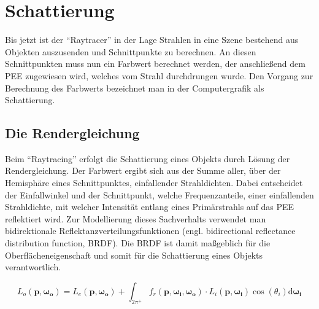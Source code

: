 

\chapter{Schattierung} \label{ch:schattierung}


Bis jetzt ist der "`Raytracer"' in der Lage Strahlen in eine Szene bestehend aus Objekten auszusenden und Schnittpunkte zu berechnen. An diesen Schnittpunkten muss nun ein Farbwert berechnet werden, der anschließend dem PEE zugewiesen wird, welches vom Strahl durchdrungen wurde. Den Vorgang zur Berechnung des Farbwerts bezeichnet man in der Computergrafik als Schattierung. 


\section{Die Rendergleichung}

Beim "`Raytracing"' erfolgt die Schattierung eines Objekts durch Lösung der Rendergleichung. Der Farbwert ergibt sich aus der Summe aller, über der Hemisphäre eines Schnittpunktes, einfallender Strahldichten. Dabei entscheidet der Einfallwinkel und der Schnittpunkt, welche Frequenzanteile, einer einfallenden Strahldichte, mit welcher Intensität entlang eines Primärstrahls auf das PEE reflektiert wird. Zur Modellierung dieses Sachverhalts verwendet man bidirektionale Reflektanzverteilungsfunktionen (engl. bidirectional reflectance distribution function, BRDF). Die BRDF ist damit maßgeblich für die Oberflächeneigenschaft und somit für die Schattierung eines Objekts verantwortlich.

\begin{equation}
    L_o(\boldsymbol{p}, \boldsymbol{\omega_o}) = L_e(\boldsymbol{p}, \boldsymbol{\omega_o}) + \int_{2\pi^+} f_r(\boldsymbol{p}, \boldsymbol{\omega_i}, \boldsymbol{\omega_o}) \cdot L_i(\boldsymbol{p}, \boldsymbol{\omega_i}) \cos(\theta_i) \mathrm{d} \boldsymbol{\omega_i}
    \label{eq:rendergleichung}
\end{equation}

